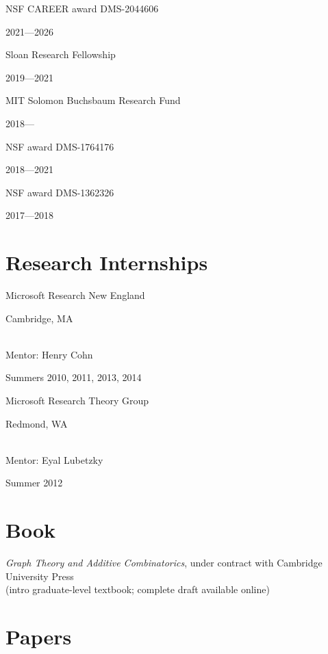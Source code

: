 \documentclass[11pt]{amsart}
\newcommand{\rightloc}[1]{\hfill {\raggedright #1}}
\newcommand{\rightdate}[1]{\hfill {\raggedright #1}}
\newcommand{\q}{\null\quad}
\begin{document}
NSF CAREER award DMS-2044606 \rightdate{2021---2026}

Sloan Research Fellowship \rightdate{2019---2021}

MIT Solomon Buchsbaum Research Fund \rightdate{2018---\phantom{2020}}

NSF award DMS-1764176 \rightdate{2018---2021}

NSF award DMS-1362326 \rightdate{2017---2018}

\section*{Research Internships}

Microsoft Research New England \rightloc{Cambridge, MA} \\
\q Mentor: Henry Cohn \rightdate{Summers 2010, 2011, 2013, 2014}

Microsoft Research Theory Group
\rightloc{Redmond, WA} \\
\q Mentor: Eyal Lubetzky \rightdate{Summer 2012}

\section*{Book}


\textit{Graph Theory and Additive Combinatorics}, 
under contract with Cambridge University Press
\\
{} \quad (intro graduate-level textbook; complete draft available online)


\section*{Papers}
\end{document}
